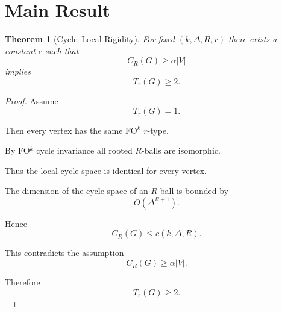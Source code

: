 \documentclass[11pt]{article}
\newtheorem{theorem}{Theorem}
\begin{document}
\section*{Main Result}

\begin{theorem}[Cycle--Local Rigidity]
For fixed $(k,\Delta,R,r)$ there exists a constant $c$ such that
\[
C_R(G)\ge \alpha |V|
\]
implies
\[
T_r(G)\ge 2.
\]
\end{theorem}

\begin{proof}

Assume
\[
T_r(G)=1.
\]

Then every vertex has the same FO$^k$ $r$-type.

By FO$^k$ cycle invariance all rooted $R$-balls are isomorphic.

Thus the local cycle space is identical for every vertex.

The dimension of the cycle space of an $R$-ball is bounded by
\[
O(\Delta^{R+1}).
\]

Hence
\[
C_R(G)\le c(k,\Delta,R).
\]

This contradicts the assumption
\[
C_R(G)\ge \alpha |V|.
\]

Therefore
\[
T_r(G)\ge2.
\]

\end{proof}
\end{document}
